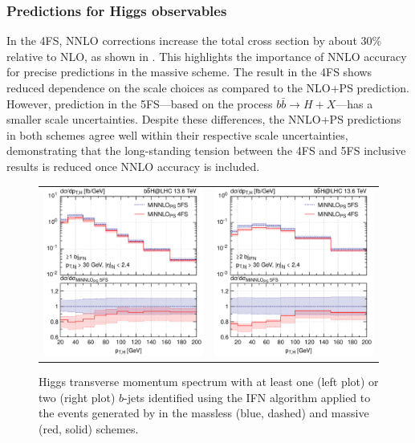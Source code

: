 \documentclass[11pt,a4paper]{article}
\begin{document}
\subsubsection*{Predictions for Higgs observables}
In the 4FS, NNLO corrections increase the total cross section by about 30\% relative to NLO, as shown in . This highlights the importance of NNLO accuracy for precise predictions in the massive scheme. The \minnlo{} result in the 4FS shows reduced dependence on the scale choices as compared to the NLO+PS prediction. However, \minnlo{} prediction in the 5FS—based on the process \(b\bar{b} \to H+X\)—has a smaller scale uncertainties. 
Despite these differences, the NNLO+PS predictions in both schemes agree well within their respective scale uncertainties, demonstrating that the long-standing tension between the 4FS and 5FS inclusive results is reduced once NNLO accuracy is included.
\begin{figure}[t!]
\begin{center}
\begin{tabular}{cc}
\includegraphics[width=.45\textwidth, page=1]{plots/4fs/pt_H-IFN-1bjet_minnlops-FC.pdf}&
\includegraphics[width=.45\textwidth, page=1]{plots/4fs/pt_H-IFN-2bjet_minnlops-FC.pdf}
\end{tabular}
\vspace*{1ex}
\caption{Higgs transverse momentum spectrum with at least one (left plot) or two (right plot) $b$-jets identified using the IFN algorithm applied to the events generated by \minnlo{} in the massless (blue, dashed) and massive (red, solid) schemes.\label{fig:4fsB}}
\end{center}
\end{figure}
\end{document}
